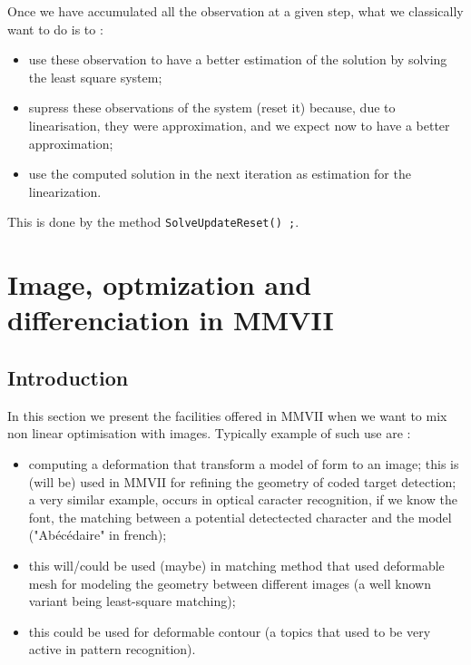 Once we have accumulated all the observation at a given step, what we classically
want to do is to :

\begin{itemize}
       \item use these observation  to have a better estimation of the solution by solving
             the least square system;

       \item supress  these observations of the system (reset it) because, due to linearisation,
             they were approximation, and we expect now to have a better approximation;

       \item use the computed solution in the next iteration as estimation for the linearization.
\end{itemize}

This is done by the method {\tt SolveUpdateReset() ;}.


\section{Image, optmization and differenciation in MMVII}

\subsection{Introduction}

In this section we present the facilities offered in MMVII when we want to mix non
linear optimisation with images. Typically example of such use are :

\begin{itemize}
     \item computing a deformation that transform a model of form  to an image;
           this is (will be) used  in MMVII for refining the  geometry of coded target detection;
           a very similar example, occurs in optical caracter recognition, if we know the font,
           the matching between a potential detectected character and the model ("Ab\'ec\'edaire" in french);

      \item this will/could be used (maybe) in matching method that used deformable mesh for modeling
            the geometry between different images (a well known variant being least-square matching);

      \item this could be used for deformable contour (a topics that used to be very active in 
            pattern recognition).
\end{itemize}

